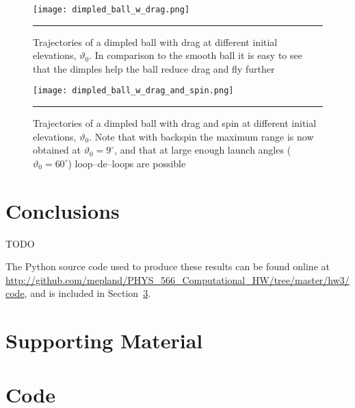 \documentclass[notitlepage,aps,prd,nofootinbib]{revtex4-1}
\begin{document}
\begin{figure}[!htbc]
  \centering
  \texttt{[image: dimpled\_ball\_w\_drag.png]}
	{\par\nobreak\rule[9pt]{35em}{0.5pt}\vspace{-5mm}}
	\caption{Trajectories of a dimpled ball with drag at different initial elevations, $\vartheta_{0}$. In comparison to the smooth ball it is easy to see that the dimples help the ball reduce drag and fly further}
	\label{fig:dimpled_ball_w_drag}
\end{figure}

\begin{figure}[!htbc]
  \centering
  \texttt{[image: dimpled\_ball\_w\_drag\_and\_spin.png]}
	{\par\nobreak\rule[9pt]{35em}{0.5pt}\vspace{-5mm}}
	\caption{Trajectories of a dimpled ball with drag and spin at different initial elevations, $\vartheta_{0}$. Note that with backspin the maximum range is now obtained at $\vartheta_{0} = 9^{\circ}$, and that at large enough launch angles ($\vartheta_{0} = 60^{\circ}$) loop--de--loops are possible}
	\label{fig:dimpled_ball_w_drag_and_spin}
\end{figure}

\clearpage

\section{Conclusions}
\label{sec:Conclusions}
TODO

The Python source code used to produce these results can be found online at \url{http://github.com/mepland/PHYS_566_Computational_HW/tree/master/hw3/code}, and is included in Section~\ref{sec:code}.

\clearpage
\section{Supporting Material}
\label{sec:Supporting_Material}


\clearpage


\clearpage
\section{Code}
\label{sec:code}


\end{document}
